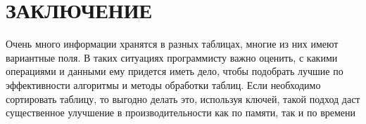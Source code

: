 \section*{ЗАКЛЮЧЕНИЕ}
Очень много информации хранятся в разных таблицах, многие из них имеют вариантные поля. В таких ситуациях программисту важно оценить, с какими операциями и данными ему придется иметь дело, чтобы подобрать лучшие по эффективности алгоритмы и методы обработки таблиц. Если необходимо сортировать таблицу, то выгодно делать это, используя ключей, такой подход даст существенное улучшение в производительности как по памяти, так и по времени